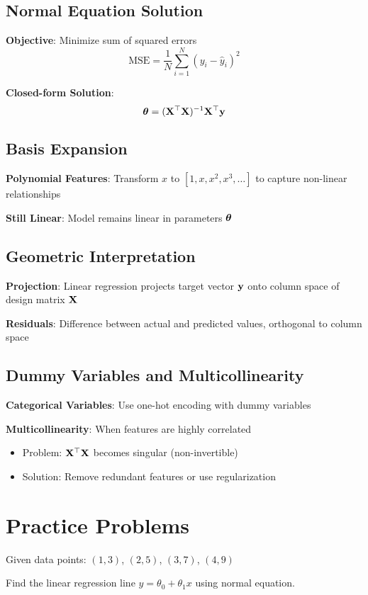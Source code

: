 \documentclass{article}
\newcounter{exercise}
\begin{document}
\subsection{Normal Equation Solution}

\textbf{Objective}: Minimize sum of squared errors
$$\text{MSE} = \frac{1}{N} \sum_{i=1}^N (y_i - \hat{y}_i)^2$$

\textbf{Closed-form Solution}:
$$\boldsymbol{\theta} = (\mathbf{X}^\top\mathbf{X})^{-1} \mathbf{X}^\top\mathbf{y}$$

\subsection{Basis Expansion}

\textbf{Polynomial Features}: Transform $x$ to $[1, x, x^2, x^3, \ldots]$ to capture non-linear relationships

\textbf{Still Linear}: Model remains linear in parameters $\boldsymbol{\theta}$

\subsection{Geometric Interpretation}

\textbf{Projection}: Linear regression projects target vector $\mathbf{y}$ onto column space of design matrix $\mathbf{X}$

\textbf{Residuals}: Difference between actual and predicted values, orthogonal to column space

\subsection{Dummy Variables and Multicollinearity}

\textbf{Categorical Variables}: Use one-hot encoding with dummy variables

\textbf{Multicollinearity}: When features are highly correlated
\begin{itemize}
    \item Problem: $\mathbf{X}^\top \mathbf{X}$ becomes singular (non-invertible)
    \item Solution: Remove redundant features or use regularization
\end{itemize}

\section{Practice Problems}

\begin{tcolorbox}[colback=gray!5!white,colframe=gray!75!black,title=Problem \stepcounter{exercise}: Basic Linear Regression]

Given data points: $(1,3)$, $(2,5)$, $(3,7)$, $(4,9)$

Find the linear regression line $y = \theta_0 + \theta_1 x$ using normal equation.
\end{tcolorbox}
\end{document}
